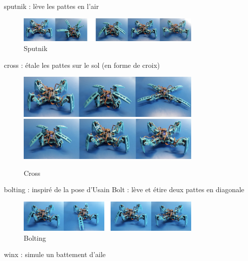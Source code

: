 sputnik : lève les pattes en l'air

\begin{figure}[H]
	\begin{center}
		\includegraphics[width=0.8\textwidth]{./img/sputnik}
		\caption{Sputnik}
	\end{center}
\end{figure}

cross : étale les pattes sur le sol (en forme de croix)

\begin{figure}[H]
	\begin{center}
		\includegraphics[width=0.8\textwidth]{./img/cross_1}
		\includegraphics[width=0.8\textwidth]{./img/cross_2}
		\caption{Cross}
	\end{center}
\end{figure}

bolting : inspiré de la pose d'Usain Bolt : lève et étire deux pattes en diagonale

\begin{figure}[H]
	\begin{center}
		\includegraphics[width=0.8\textwidth]{./img/bolting}
		\caption{Bolting}
	\end{center}
\end{figure}

winx : simule un battement d'aile

